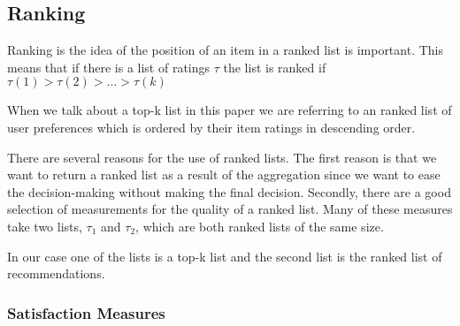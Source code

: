 \subsection{Ranking}\label{sec:ranking}
Ranking is the idea of the position of an item in a ranked list is important. This means that if there is a list of ratings $\tau$ the list is ranked if $\tau (1) > \tau (2) > ... > \tau (k)$

When we talk about a top-k list in this paper we are referring to an ranked list of user preferences which is ordered by their item ratings in descending order.

There are several reasons for the use of ranked lists. 
The first reason is that we want to return a ranked list as a result of the aggregation since we want to ease the decision-making without making the final decision.
Secondly, there are a good selection of measurements for the quality of a ranked list. Many of these measures take two lists, $\tau_1$ and $\tau_2$, which are both ranked lists of the same size. 

In our case one of the lists is a top-k list and the second list is the ranked list of recommendations.

\subsubsection{Satisfaction Measures}

